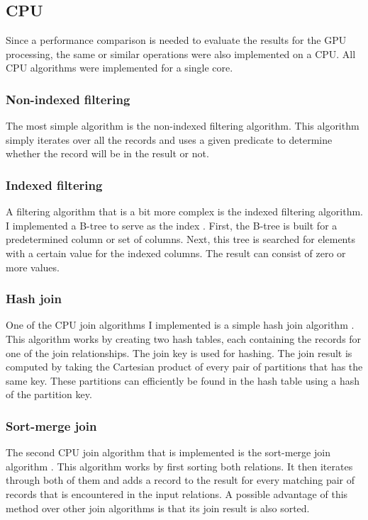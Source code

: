 \documentclass[a4paper,titlepage]{article}
\begin{document}
\subsection{CPU}
\label{sec:cpu-implementation}
Since a performance comparison is needed to evaluate the results for the GPU processing, the same or similar operations were also implemented on a CPU. All CPU algorithms were implemented for a single core.

\subsubsection{Non-indexed filtering}
The most simple algorithm is the non-indexed filtering algorithm. This algorithm simply iterates over all the records and uses a given predicate to determine whether the record will be in the result or not.

\subsubsection{Indexed filtering}
A filtering algorithm that is a bit more complex is the indexed filtering algorithm. I implemented a B-tree to serve as the index \cite{comer1979}. First, the B-tree is built for a predetermined column or set of columns. Next, this tree is searched for elements with a certain value for the indexed columns. The result can consist of zero or more values.

\subsubsection{Hash join}
One of the CPU join algorithms I implemented is a simple hash join algorithm \cite{dewitt1985}. This algorithm works by creating two hash tables, each containing the records for one of the join relationships. The join key is used for hashing. The join result is computed by taking the Cartesian product of every pair of partitions that has the same key. These partitions can efficiently be found in the hash table using a hash of the partition key.

\subsubsection{Sort-merge join}
The second CPU join algorithm that is implemented is the sort-merge join algorithm \cite{blasgen1977}. This algorithm works by first sorting both relations. It then iterates through both of them and adds a record to the result for every matching pair of records that is encountered in the input relations. A possible advantage of this method over other join algorithms is that its join result is also sorted.
\end{document}
